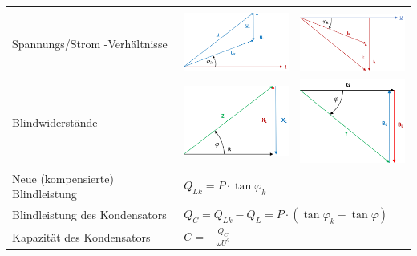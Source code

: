 \begin{tabular}{p{7cm}|p{4.5cm}|p{5cm}}
\begin{minipage}{4.5cm}
        \end{minipage} \\
	Spannungs/Strom -Verhältnisse &
		\begin{minipage}{4.5cm}
			\includegraphics[width=3.5cm]{bilder/Seriell-Kompensation_RostBau.jpg}%
		\end{minipage} &
		\begin{minipage}{4.5cm}
			\includegraphics[width=3.5cm]{bilder/Parallel-Kompensation_RostBau.jpg} \newline
		\end{minipage} \\
	Blindwiderstände &
		\begin{minipage}{4.5cm}
			\includegraphics[width=3.5cm]{bilder/Seriell-Blindwiderstaende_RostBau.jpg}%
		\end{minipage} &
		\begin{minipage}{4.5cm}
			\includegraphics[width=3.5cm]{bilder/Parallel-Blindwiderstaende_RostBau.jpg} \newline
		\end{minipage} \\
	\hline
	Neue (kompensierte) Blindleistung &
		\multicolumn{2}{l}{$Q_{Lk} = P \cdot \tan{\varphi_k}$} \\
	Blindleistung des Kondensators & 
		\multicolumn{2}{l}{$Q_C = Q_{Lk} - Q_L =  P\cdot (\tan{\varphi_k}-\tan{\varphi}) $} \\
	Kapazität des Kondensators &
		\multicolumn{2}{l}{$C = - \frac{Q_C}{\omega U^2}$} \\
		\hline	
	\end{tabular}
\renewcommand{\arraystretch}{1}